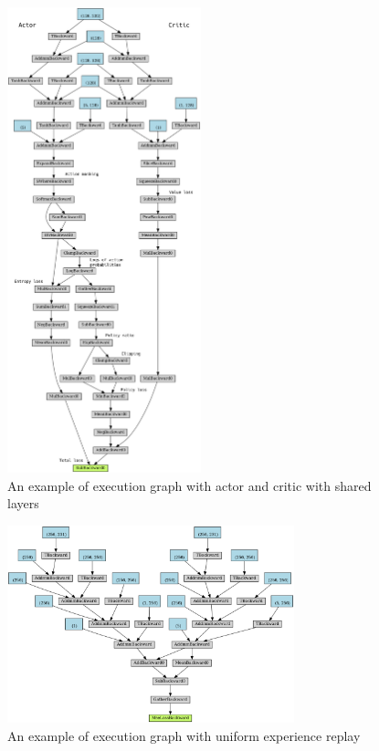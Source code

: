 \documentclass[11pt, a4paper, hidelinks]{report}
\begin{document}
\begin{figure}
\centering
\includegraphics[width=0.5\textwidth]{resources/psppo_shared_graph_commented.png}
\caption{An example of execution graph with actor and critic with shared layers}
\label{fig:psppo_shared_graph_commented}
\end{figure}

\begin{figure}
\centering
\includegraphics[width=0.74\textwidth]{resources/d3qn_uer_graph.png}
\caption{An example of execution graph with uniform experience replay}
\label{fig:d3qn_uer_graph}
\end{figure}
\end{document}
